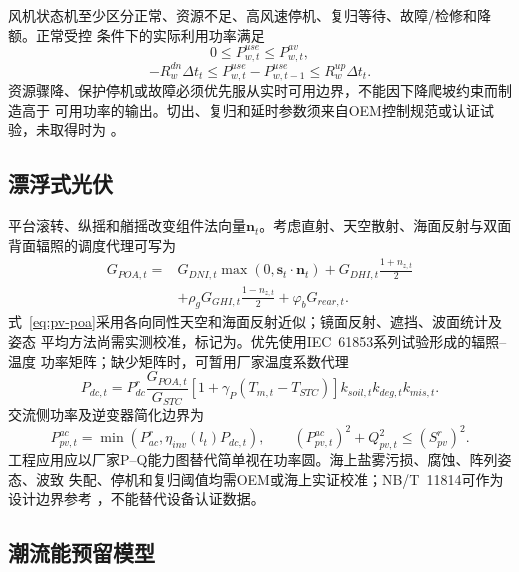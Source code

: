 风机状态机至少区分正常、资源不足、高风速停机、复归等待、故障/检修和降额。正常受控
条件下的实际利用功率满足
\begin{equation}
0\le P_{w,t}^{use}\le P_{w,t}^{av},
\label{eq:wind-available}
\end{equation}
\begin{equation}
-R_w^{dn}\Delta t_t\le P_{w,t}^{use}-P_{w,t-1}^{use}
\le R_w^{up}\Delta t_t.
\label{eq:wind-ramp}
\end{equation}
资源骤降、保护停机或故障必须优先服从实时可用边界，不能因下降爬坡约束而制造高于
可用功率的输出。切出、复归和延时参数须来自OEM控制规范或认证试验，未取得时为
\assumptiontag。

\subsection{漂浮式光伏}

平台滚转、纵摇和艏摇改变组件法向量$\bm n_t$。考虑直射、天空散射、海面反射与双面
背面辐照的调度代理可写为
\begin{equation}
\begin{aligned}
G_{POA,t}={}&G_{DNI,t}\max(0,\bm s_t\!\cdot\!\bm n_t)
+G_{DHI,t}\frac{1+n_{z,t}}{2}\\
&+\rho_gG_{GHI,t}\frac{1-n_{z,t}}{2}
+\varphi_bG_{rear,t}.
\end{aligned}
\label{eq:pv-poa}
\end{equation}
式~\eqref{eq:pv-poa}采用各向同性天空和海面反射近似；镜面反射、遮挡、波面统计及姿态
平均方法尚需实测校准，标记为\verifytag。优先使用IEC~61853系列试验形成的辐照--温度
功率矩阵\cite{iec61853}；缺少矩阵时，可暂用厂家温度系数代理
\begin{equation}
P_{dc,t}=P_{dc}^{r}\frac{G_{POA,t}}{G_{STC}}
\left[1+\gamma_P(T_{m,t}-T_{STC})\right]
k_{soil,t}k_{deg,t}k_{mis,t}.
\label{eq:pv-dc}
\end{equation}
交流侧功率及逆变器简化边界为
\begin{equation}
P_{pv,t}^{ac}=\min\!\left(P_{ac}^{r},\eta_{inv}(l_t)P_{dc,t}\right),
\qquad (P_{pv,t}^{ac})^2+Q_{pv,t}^2\le(S_{pv}^{r})^2.
\label{eq:pv-ac}
\end{equation}
工程应用应以厂家P--Q能力图替代简单视在功率圆。海上盐雾污损、腐蚀、阵列姿态、波致
失配、停机和复归阈值均需OEM或海上实证校准；NB/T~11814可作为设计边界参考
\cite{nbt11814}，不能替代设备认证数据。

\subsection{潮流能预留模型}

